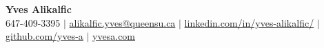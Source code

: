 \begin{center}
	\textbf{\Huge Yves Alikalfic} \\ \vspace{5pt}
	\small 647-409-3395 $|$
    \href{mailto:alikalfic.yves@queensu.ca}{alikalfic.yves@queensu.ca} $|$
	\href{https://www.linkedin.com/in/yves-alikalfic/}{linkedin.com/in/yves-alikalfic/} $|$
	\href{https://github.com/yves-a}{github.com/yves-a} $|$
	\href{https://yvesa.com}{yvesa.com}
\end{center}